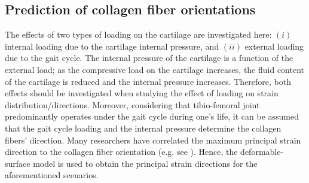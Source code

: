 \subsection*{Prediction of collagen fiber orientations}
The effects of two types of loading on the cartilage are investigated here: $(i)$ internal loading due to the cartilage internal pressure, and $(ii)$ external loading due to the gait cycle. The internal pressure of the cartilage is a function of the external load; as the compressive load on the cartilage increases, the fluid content of the cartilage is reduced and the internal pressure increases. Therefore, both effects should be investigated when studying the effect of loading on strain distribution/directions. Moreover, considering that tibio-femoral joint predominantly operates under the gait cycle during one's life, it can be  assumed that the gait cycle loading and the internal pressure determine the collagen fibers' direction. Many researchers have correlated the maximum principal strain direction to the collagen fiber orientation (e.g. see \cite{Below2002}). Hence, the deformable-surface model is used to obtain the principal strain directions for the aforementioned scenarios.

